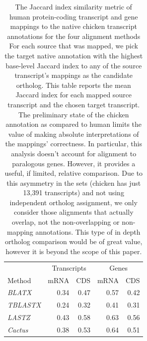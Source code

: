 \documentclass{article}
\begin{document}
\begin{table}[!htb]
\begin{center}
\begin{tabular}{l|r|r|r|r}
\multicolumn{1}{c}{} &  \multicolumn{2}{c|}{Transcripts} & \multicolumn{2}{c}{Genes} \\
\cmidrule{2-3}\cmidrule{4-5}
Method           & mRNA & CDS   & mRNA  & CDS \\
\midrule
\textit{BLATX}   & 0.34 &  0.47 &  0.57 &  0.42 \\
\textit{TBLASTX} & 0.24 &  0.32 &  0.41 &  0.31 \\
\textit{LASTZ}   & 0.43 &  0.58 &  0.63 &  0.56 \\
\textit{Cactus}  & 0.38 &  0.53 &  0.64 &  0.51 \\
\end{tabular}
\caption{
The Jaccard index similarity metric of human protein-coding transcript and gene mappings to the
native chicken transcript annotations for the four alignment methods
For each source that was mapped, we pick the target native annotation
with the highest base-level Jaccard index to any of the source
transcript's mappings as the candidate ortholog.  This table reports the
mean Jaccard index for each mapped source transcript and the chosen target
transcript.  The preliminary state of the chicken annotation as compared to
human limits the value of making absolute interpretations of the mappings'
correctness.  In particular, this analysis doesn't account for alignment
to paralogous genes.
However, it provides a useful, if limited, relative comparison.  Due to this
asymmetry in the sets (chicken has just 13,391 transcripts)
and not using independent ortholog assignment, we only
consider those alignments that actually overlap, not the non-overlapping
or non-mapping annotations.  This type of in depth ortholog comparison would
be of great value, however it is beyond the scope of this paper.
}\label{tab:humanChickenTranscriptNativeSim}
\end{center}
\end{table}



\end{document}
